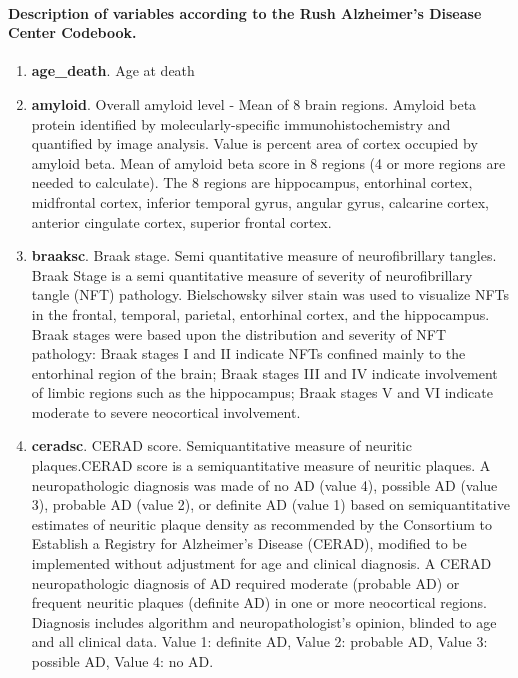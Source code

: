 \paragraph{Description of variables according to the Rush Alzheimer’s Disease Center Codebook.}
\begin{enumerate}
    \item \textbf{age\_death}. Age at death
    \item \textbf{amyloid}. Overall amyloid level - Mean of 8 brain regions. Amyloid beta protein identified by molecularly-specific immunohistochemistry and quantified by image analysis. Value is percent area of cortex occupied by amyloid beta. Mean of amyloid beta score in 8 regions (4 or more regions are needed to calculate). The 8 regions are hippocampus, entorhinal cortex, midfrontal cortex, inferior temporal gyrus, angular gyrus, calcarine cortex, anterior cingulate cortex, superior frontal cortex.
    \item \textbf{braaksc}. Braak stage. Semi quantitative measure of neurofibrillary tangles. Braak Stage is a semi quantitative measure of severity of neurofibrillary tangle (NFT) pathology. Bielschowsky silver stain was used to visualize NFTs in the frontal, temporal, parietal, entorhinal cortex, and the hippocampus. Braak stages were based upon the distribution and severity of NFT pathology: Braak stages I and II indicate NFTs confined mainly to the entorhinal region of the brain; Braak stages III and IV indicate involvement of limbic regions such as the hippocampus; Braak stages V and VI indicate moderate to severe neocortical involvement.
    \item \textbf{ceradsc}. CERAD score. Semiquantitative measure of neuritic plaques.CERAD score is a semiquantitative measure of neuritic plaques. A neuropathologic diagnosis was made of no AD (value 4), possible AD (value 3), probable AD (value 2), or definite AD (value 1) based on semiquantitative estimates of neuritic plaque density as recommended by the Consortium to Establish a Registry for Alzheimer’s Disease (CERAD), modified to be implemented without adjustment for age and clinical diagnosis. A CERAD neuropathologic diagnosis of AD required moderate (probable AD) or frequent neuritic plaques (definite AD) in one or more neocortical regions. Diagnosis includes algorithm and neuropathologist’s opinion, blinded to age and all clinical data. Value 1: definite AD, Value 2: probable AD, Value 3: possible AD, Value 4: no AD.

\end{enumerate}
